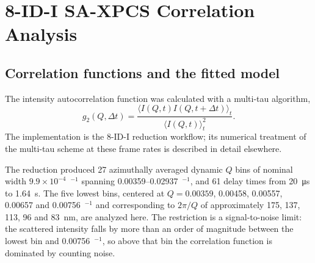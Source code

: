 \documentclass[11pt]{article}
\newcommand{\Ainv}{\text{\AA}$^{-1}$}
\begin{document}
\section{8-ID-I SA-XPCS Correlation Analysis}
\label{sec:b8xpcs}
\subsection{Correlation functions and the fitted model}
The intensity autocorrelation function was calculated with a multi-tau algorithm,
\begin{equation}
 g_2(Q,\Delta t)=\frac{\langle I(Q,t)I(Q,t+\Delta t)\rangle_t}{\langle I(Q,t)\rangle_t^2}.
 \label{eq:si-g2}
 \end{equation}
\noindent The implementation is the 8-ID-I reduction workflow; its numerical treatment of the multi-tau scheme at these frame rates is described in detail elsewhere.\cite{Zhang2021-jl,Switalski2022-jsr}

The reduction produced 27 azimuthally averaged dynamic $Q$ bins of nominal width $9.9\times10^{-4}$~\Ainv{} spanning \SIrange{0.00359}{0.02937}{}~\Ainv, and 61 delay times from \SI{20}{\micro\second} to \SI{1.64}{\second}. The five lowest bins, centered at $Q=0.00359$, 0.00458, 0.00557, 0.00657 and 0.00756~\Ainv{} and corresponding to $2\pi/Q$ of approximately 175, 137, 113, 96 and \SI{83}{\nano\meter}, are analyzed here. The restriction is a signal-to-noise limit: the scattered intensity falls by more than an order of magnitude between the lowest bin and 0.00756~\Ainv, so above that bin the correlation function is dominated by counting noise.
\end{document}
